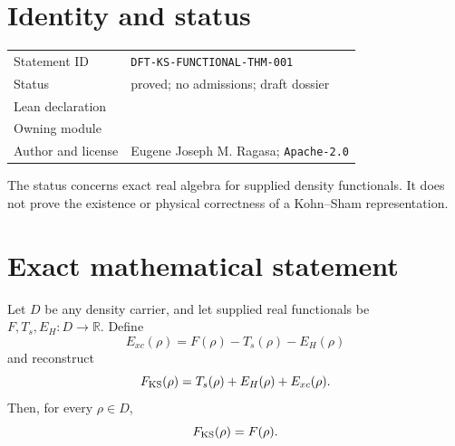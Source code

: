 
\section{Identity and status}
\begin{tabularx}{\textwidth}{@{}lY@{}}
\toprule
Statement ID & \texttt{DFT-KS-FUNCTIONAL-THM-001} \\
Status & proved; no admissions; draft dossier \\
Lean declaration &  \\
Owning module &  \\
Author and license & Eugene Joseph M. Ragasa; \texttt{Apache-2.0} \\
\bottomrule
\end{tabularx}
The status concerns exact real algebra for supplied density functionals.  It does not prove the
existence or physical correctness of a Kohn--Sham representation.

\section{Exact mathematical statement}
Let \(D\) be any density carrier, and let supplied real functionals be
\(F,T_s,E_H:D\to\mathbb R\).  Define
\[
 E_{xc}(\rho)=F(\rho)-T_s(\rho)-E_H(\rho)
\]
and reconstruct
\[
 F_{\rm KS}(\rho)=T_s(\rho)+E_H(\rho)+E_{xc}(\rho).
\]
Then, for every \(\rho\in D\),
\[
 F_{\rm KS}(\rho)=F(\rho).
\]


